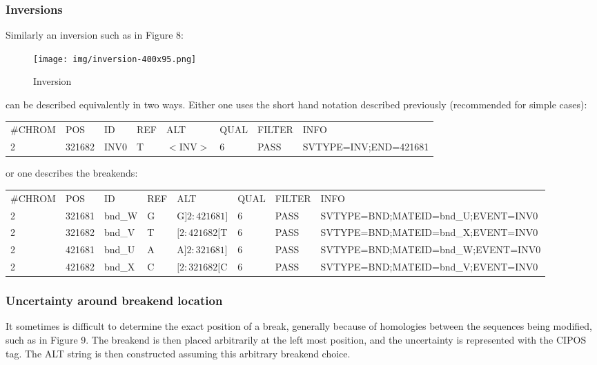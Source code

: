 \documentclass[8pt]{article}
\begin{document}
\subsubsection{Inversions}
Similarly an inversion such as in Figure 8:

\begin{figure}[ht]
\centering
\texttt{[image: img/inversion-400x95.png]}
\caption{Inversion}
\end{figure}

can be described equivalently in two ways. Either one uses the short hand notation described previously (recommended for simple cases):

\vspace{0.3cm}
\small
\begin{tabular}{ l l l l l l l l }
\#CHROM & POS & ID & REF & ALT & QUAL & FILTER & INFO \\
2 & 321682 & INV0 & T & $<$INV$>$ & 6 & PASS & SVTYPE=INV;END=421681 \\
\end{tabular}
\normalsize
\vspace{0.3cm}

or one describes the breakends:

\vspace{0.3cm}
\footnotesize
\begin{tabular}{ l l l l l l l l }
\#CHROM & POS & ID & REF & ALT & QUAL & FILTER & INFO \\
2 & 321681 & bnd\_W & G & G$]2:421681]$ & 6 & PASS & SVTYPE=BND;MATEID=bnd\_U;EVENT=INV0 \\
2 & 321682 & bnd\_V & T & $[2:421682[$T & 6 & PASS & SVTYPE=BND;MATEID=bnd\_X;EVENT=INV0 \\
2 & 421681 & bnd\_U & A & A$]2:321681]$ & 6 & PASS & SVTYPE=BND;MATEID=bnd\_W;EVENT=INV0 \\
2 & 421682 & bnd\_X & C & $[2:321682[$C & 6 & PASS & SVTYPE=BND;MATEID=bnd\_V;EVENT=INV0 \\
\end{tabular}
\normalsize

\subsubsection{Uncertainty around breakend location}
It sometimes is difficult to determine the exact position of a break, generally because of homologies between the sequences being modified, such as in Figure 9. The breakend is then placed arbitrarily at the left most position, and the uncertainty is represented with the CIPOS tag. The ALT string is then constructed assuming this arbitrary breakend choice.
\end{document}
